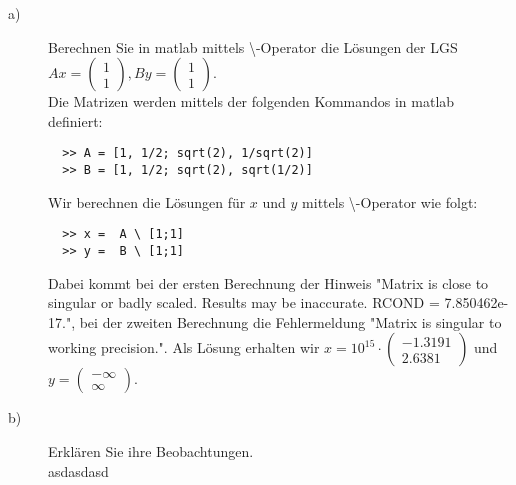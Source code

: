 \documentclass[11pt,a4paper,ngerman]{article}
\begin{document}
\begin{description}

\item[a)] Berechnen Sie in matlab mittels \textbackslash -Operator die Lösungen der LGS \\
          $Ax = \left( \begin{array}{c} 1 \\ 1\end{array}\right), 
           By = \left( \begin{array}{c} 1 \\ 1\end{array}\right)$. \\
            
          Die Matrizen werden mittels der folgenden Kommandos in matlab definiert:          
          \begin{lstlisting}
  >> A = [1, 1/2; sqrt(2), 1/sqrt(2)]
  >> B = [1, 1/2; sqrt(2), sqrt(1/2)]
          \end{lstlisting}
          
          Wir berechnen die Lösungen für $x$ und $y$ mittels \textbackslash -Operator wie folgt:

          \begin{lstlisting}
  >> x =  A \ [1;1]
  >> y =  B \ [1;1]
          \end{lstlisting}

          Dabei kommt bei der ersten Berechnung der Hinweis "Matrix is close to singular or badly scaled. Results may be inaccurate. RCOND = 7.850462e-17.", bei der zweiten Berechnung die Fehlermeldung "Matrix is singular to working precision.".
          Als Lösung erhalten wir
          $x = 10^{15} \cdot \left( \begin{array}{c} -1.3191 \\ 2.6381 \end{array} \right)$ und
          $y = \left( \begin{array}{c} -\infty \\ \infty \end{array} \right)$.

\item[b)] Erklären Sie ihre Beobachtungen. \\
              
          asdasdasd

\end{description}
\end{document}
